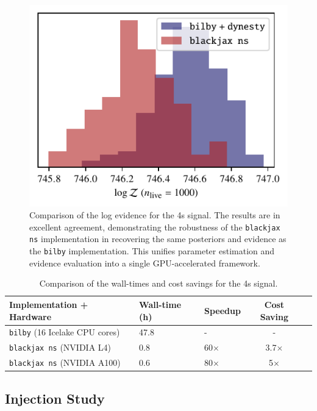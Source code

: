 \documentclass[fleqn,usenatbib]{mnras}
\begin{document}
\begin{figure}
    \centering
    \includegraphics{figures/4s_logZ_comparison.pdf}
    \caption{Comparison of the log evidence for the 4s signal. The results are in excellent agreement, demonstrating the
    robustness of the \texttt{blackjax ns} implementation in recovering the same posteriors and evidence as the \texttt{bilby} implementation.
    This unifies parameter estimation and evidence evaluation into a single GPU-accelerated framework.}
    \label{fig:4s_logZ_comparison}
\end{figure}

\begin{table}
    \setlength{\tabcolsep}{3pt}
    \centering
    \caption{Comparison of the wall-times and cost savings for the 4s signal.}
    \label{tab:4s_time_comparison}
    \begin{tabular}{l l l c c}
    \hline
    \hline
    \textbf{Implementation + Hardware} & \textbf{Wall-time (h)} & \textbf{Speedup} & \textbf{Cost Saving} \\
    \hline
    \texttt{bilby} (16 Icelake CPU cores) & 47.8 & - & - \\
    \texttt{blackjax ns} (NVIDIA L4) & 0.8 & 60$\times$ & 3.7$\times$ \\
    \texttt{blackjax ns} (NVIDIA A100) & 0.6 & 80$\times$ & 5$\times$ \\
    \hline
    \hline
    \end{tabular}
    \end{table}


\subsection{Injection Study}
\label{sec:injection_study}
\end{document}
